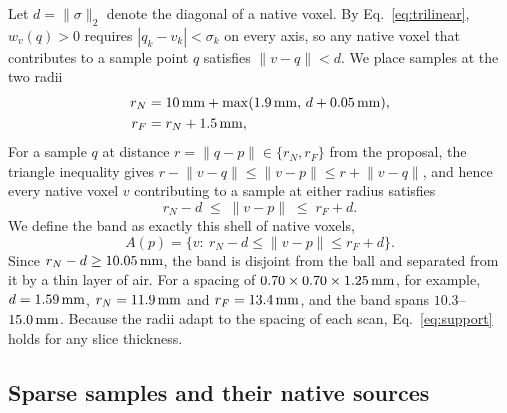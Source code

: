 Let $d=\lVert \sigma\rVert_2$ denote the diagonal of a native voxel. By Eq.~\eqref{eq:trilinear}, $w_v(q)>0$ requires $|q_k-v_k|<\sigma_k$ on every axis, so any native voxel that contributes to a sample point $q$ satisfies $\lVert v-q\rVert<d$. We place samples at the two radii
\begin{equation}
 \begin{aligned}
 r_N &=10\,\mathrm{mm}+\max(1.9\,\mathrm{mm},\,d+0.05\,\mathrm{mm}),\\
 r_F &=r_N+1.5\,\mathrm{mm} ,
 \end{aligned}
 \label{eq:radii}
\end{equation}
For a sample $q$ at distance $r=\lVert q-p\rVert\in\{r_N,r_F\}$ from the proposal, the triangle inequality gives $r-\lVert v-q\rVert\le\lVert v-p\rVert\le r+\lVert v-q\rVert$, and hence every native voxel $v$ contributing to a sample at either radius satisfies
\begin{equation}
 r_N-d\;\leq\;\lVert v-p\rVert\;\leq\;r_F+d .
 \label{eq:support}
\end{equation}
We define the band as exactly this shell of native voxels,
\begin{equation}
A(p)=\{v:\ r_N-d\le\lVert v-p\rVert\le r_F+d\}.
\label{eq:band}
\end{equation}
Since $r_N-d\ge10.05\,\mathrm{mm}$, the band is disjoint from the ball and separated from it by a thin layer of air. For a spacing of $0.70\times0.70\times1.25\,\mathrm{mm}$, for example, $d=1.59\,\mathrm{mm}$, $r_N=11.9\,\mathrm{mm}$ and $r_F=13.4\,\mathrm{mm}$, and the band spans $10.3$--$15.0\,\mathrm{mm}$. Because the radii adapt to the spacing of each scan, Eq.~\eqref{eq:support} holds for any slice thickness.



\subsection{Sparse samples and their native sources}
\label{sec:source_method}

